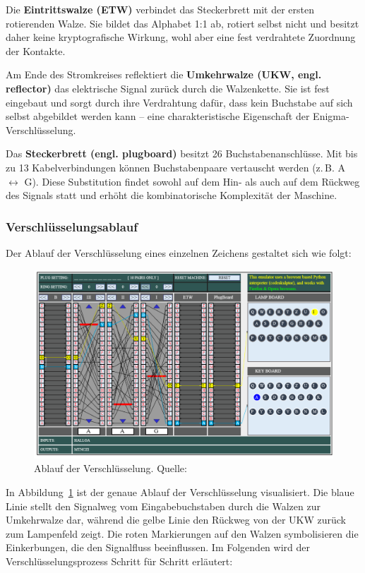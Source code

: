 \documentclass[12pt, ngerman, a4paper, numbers=noenddot]{article}
\begin{document}
Die \textbf{Eintrittswalze (ETW)} verbindet das Steckerbrett mit der ersten rotierenden Walze. Sie bildet das Alphabet 1:1 ab, rotiert selbst nicht und besitzt daher keine kryptografische Wirkung, wohl aber eine fest verdrahtete Zuordnung der Kontakte.

Am Ende des Stromkreises reflektiert die \textbf{Umkehrwalze (UKW, engl. reflector)} das elektrische Signal zurück durch die Walzenkette. Sie ist fest eingebaut und sorgt durch ihre Verdrahtung dafür, dass kein Buchstabe auf sich selbst abgebildet werden kann – eine charakteristische Eigenschaft der Enigma-Verschlüsselung.

Das \textbf{Steckerbrett (engl. plugboard)} besitzt 26 Buchstabenanschlüsse. Mit bis zu 13 Kabelverbindungen können Buchstabenpaare vertauscht werden (z.\,B. A $\leftrightarrow$ G). Diese Substitution findet sowohl auf dem Hin- als auch auf dem Rückweg des Signals statt und erhöht die kombinatorische Komplexität der Maschine.


\newpage
\subsubsection{Verschlüsselungsablauf}

Der Ablauf der Verschlüsselung eines einzelnen Zeichens gestaltet sich wie folgt:

\begin{figure}[H]
	\centering
	\includegraphics[width=1\textwidth]{bilder/simulator.png}
	\caption{Ablauf der Verschlüsselung. Quelle: \cite{piotte:enigma}}
	\label{fig:verschluesselungsablauf}
\end{figure}



In Abbildung~\ref{fig:verschluesselungsablauf} ist der genaue Ablauf der Verschlüsselung visualisiert. Die blaue Linie stellt den Signalweg vom Eingabebuchstaben durch die Walzen zur Umkehrwalze dar, während die gelbe Linie den Rückweg von der UKW zurück zum Lampenfeld zeigt. Die roten Markierungen auf den Walzen symbolisieren die Einkerbungen, die den Signalfluss beeinflussen. Im Folgenden wird der Verschlüsselungsprozess Schritt für Schritt erläutert:
\end{document}
